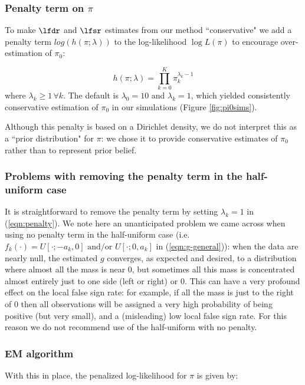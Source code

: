 \subsubsection*{Penalty term on $\pi$}

To make $\lfdr$ and $\lfsr$ estimates from our method ``conservative" we add a penalty 
term $log(h(\pi;\lambda))$ to the log-likelihood $\log L(\pi)$ to encourage over-estimation of $\pi_0$:

\begin{equation}
\label{eqn:penalty}
h(\pi;\lambda) = \prod_{k=0}^K \pi_k^{\lambda_k-1}
\end{equation}
where $\lambda_k \geq 1 \, \forall k$. The default is $\lambda_0=10$ and $\lambda_k=1$, which yielded
consistently conservative estimation of $\pi_0$ in our simulations (Figure \ref{fig:pi0sims}).

Although this penalty is based on a Dirichlet density, we do not interpret this as a ``prior distribution" for $\pi$:
we chose it to provide conservative estimates of $\pi_0$ rather than to represent prior belief.

\subsubsection*{Problems with removing the penalty term in the half-uniform case}

It is straightforward to remove the penalty term by setting $\lambda_k=1$ in (\ref{eqn:penalty}).
We note here an unanticipated problem we came across when using no penalty term in the half-uniform case 
(i.e.~ $f_k(\cdot) = U[\cdot; -a_k,0] \text{ and/or } U[\cdot; 0,a_k]$ in (\ref{eqn:g-general})): when the data
are nearly null, the estimated $g$ converges, as expected and desired, to a distribution where almost all the mass is near 0, but
sometimes all this mass is concentrated almost entirely just to one side (left or right) or 0. This can have a very profound effect on the local false sign rate:
for example, if all the mass is just to the right of 0 then all observations will be assigned a very high probability of being positive (but very small),
and a (misleading) low local false sign rate. For this reason we do not recommend use of the half-uniform with no penalty.

\subsubsection*{EM algorithm}

With this in place, the penalized log-likelihood for $\pi$ is given by:

